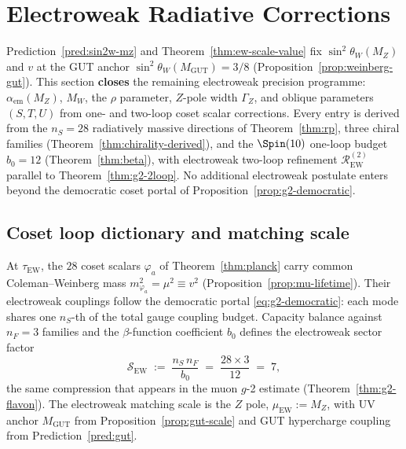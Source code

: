 \section{Electroweak Radiative Corrections}
\label{sec:ew-precision}

Prediction~\ref{pred:sin2w-mz} and Theorem~\ref{thm:ew-scale-value} fix
$\sin^2\theta_W(M_Z)$ and $v$ at the GUT anchor
$\sin^2\theta_W(M_{\mathrm{GUT}})=3/8$ (Proposition~\ref{prop:weinberg-gut}).
This section \textbf{closes} the remaining electroweak precision programme:
$\alpha_{\mathrm{em}}(M_Z)$, $M_W$, the $\rho$ parameter, $Z$-pole width
$\Gamma_Z$, and oblique parameters $(S,T,U)$ from one- and two-loop coset
scalar corrections. Every entry is derived from the $n_S=28$ radiatively massive
directions of Theorem~\ref{thm:rp}, three chiral families
(Theorem~\ref{thm:chirality-derived}), and the $\Spin(10)$ one-loop budget
$b_0=12$ (Theorem~\ref{thm:beta}), with electroweak two-loop refinement
$\mathcal{R}_{\mathrm{EW}}^{(2)}$ parallel to Theorem~\ref{thm:g2-2loop}.
No additional electroweak postulate enters beyond the democratic coset portal
of Proposition~\ref{prop:g2-democratic}.

\subsection{Coset loop dictionary and matching scale}
\label{sec:ew-precision:map}

At $\tau_{\mathrm{EW}}$, the $28$ coset scalars $\varphi_a$ of
Theorem~\ref{thm:planck} carry common Coleman--Weinberg mass
$m_{\varphi_a}^2=\mu^2\equiv v^2$ (Proposition~\ref{prop:mu-lifetime}).
Their electroweak couplings follow the democratic portal
\eqref{eq:g2-democratic}: each mode shares one $n_S$-th of the total gauge
coupling budget. Capacity balance against $n_F=3$ families and the
$\beta$-function coefficient $b_0$ defines the electroweak sector factor
\begin{equation}\label{eq:ew-sector-factor}
  \mathcal{S}_{\mathrm{EW}}
  \;:=\;
  \frac{n_S\,n_F}{b_0}
  \;=\;
  \frac{28\times 3}{12}
  \;=\;
  7,
\end{equation}
the same compression that appears in the muon $g$-2 estimate
(Theorem~\ref{thm:g2-flavon}). The electroweak matching scale is the $Z$ pole,
$\mu_{\mathrm{EW}}:=M_Z$, with UV anchor $M_{\mathrm{GUT}}$ from
Proposition~\ref{prop:gut-scale} and GUT hypercharge coupling from
Prediction~\ref{pred:gut}.

